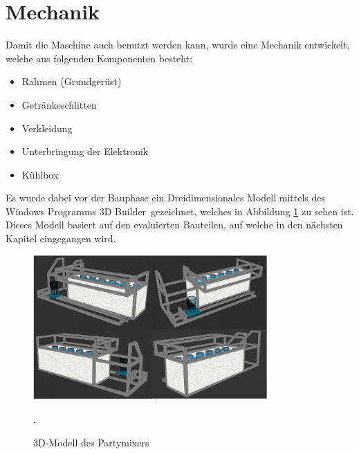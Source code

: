 \section{Mechanik}
\label{sec:Mechanik}

Damit die Maschine auch benutzt werden kann, wurde eine Mechanik entwickelt, welche aus folgenden Komponenten besteht: 

\begin{itemize}
\item Rahmen (Grundgerüst)
\item Getränkeschlitten 
\item Verkleidung
\item Unterbringung der Elektronik
\item Kühlbox
\end{itemize}

Es wurde dabei vor der Bauphase ein Dreidimensionales Modell mittels des Windows Programms \flqq 3D Builder\frqq~gezeichnet, welches in Abbildung \ref{fig:3DModell} zu sehen ist. Dieses Modell basiert auf den evaluierten Bauteilen, auf welche in den nächsten Kapitel eingegangen wird.

\begin{figure}[H]
	\centering
	\includegraphics[width=0.8\textwidth]{graphics/3DModell}
	\caption{3D-Modell des Partymixers}.
	\label{fig:3DModell}
\end{figure}

